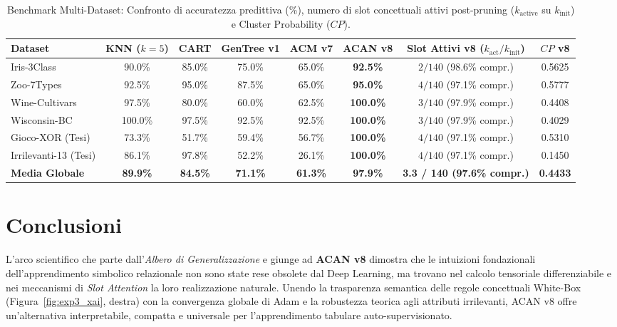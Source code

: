 \documentclass[10pt,a4paper]{article}
\begin{document}
\begin{table}[!htbp]
\centering
\caption{Benchmark Multi-Dataset: Confronto di accuratezza predittiva (\%), numero di slot concettuali attivi post-pruning ($k_{\text{active}}$ su $k_{\text{init}}$) e Cluster Probability ($CP$).}
\label{tab:multidataset}
\footnotesize
\setlength{\tabcolsep}{4.0pt}
\begin{tabular}{lccccccc}
\toprule
\textbf{Dataset} & \textbf{KNN ($k=5$)} & \textbf{CART} & \textbf{GenTree v1} & \textbf{ACM v7} & \textbf{ACAN v8} & \textbf{Slot Attivi v8 ($k_{\text{act}}/k_{\text{init}}$)} & \textbf{$CP$ v8} \\
\midrule
Iris-3Class & 90.0\% & 85.0\% & 75.0\% & 65.0\% & \textbf{92.5\%} & $2 / 140$ (98.6\% compr.) & 0.5625 \\
Zoo-7Types & 92.5\% & 95.0\% & 87.5\% & 65.0\% & \textbf{95.0\%} & $4 / 140$ (97.1\% compr.) & 0.5777 \\
Wine-Cultivars & 97.5\% & 80.0\% & 60.0\% & 62.5\% & \textbf{100.0\%} & $3 / 140$ (97.9\% compr.) & 0.4408 \\
Wisconsin-BC & 100.0\% & 97.5\% & 92.5\% & 92.5\% & \textbf{100.0\%} & $3 / 140$ (97.9\% compr.) & 0.4029 \\
Gioco-XOR (Tesi) & 73.3\% & 51.7\% & 59.4\% & 56.7\% & \textbf{100.0\%} & $4 / 140$ (97.1\% compr.) & 0.5310 \\
Irrilevanti-13 (Tesi) & 86.1\% & 97.8\% & 52.2\% & 26.1\% & \textbf{100.0\%} & $4 / 140$ (97.1\% compr.) & 0.1450 \\
\midrule
\textbf{Media Globale} & \textbf{89.9\%} & \textbf{84.5\%} & \textbf{71.1\%} & \textbf{61.3\%} & \textbf{97.9\%} & \textbf{3.3 / 140 (97.6\% compr.)} & \textbf{0.4433} \\
\bottomrule
\end{tabular}
\end{table}

\section{Conclusioni}
L'arco scientifico che parte dall'\textit{Albero di Generalizzazione} e giunge ad \textbf{ACAN v8} dimostra che le intuizioni fondazionali dell'apprendimento simbolico relazionale non sono state rese obsolete dal Deep Learning, ma trovano nel calcolo tensoriale differenziabile e nei meccanismi di \textit{Slot Attention} la loro realizzazione naturale. Unendo la trasparenza semantica delle regole concettuali White-Box (Figura~\ref{fig:exp3_xai}, destra) con la convergenza globale di Adam e la robustezza teorica agli attributi irrilevanti, ACAN v8 offre un'alternativa interpretabile, compatta e universale per l'apprendimento tabulare auto-supervisionato.
\end{document}
